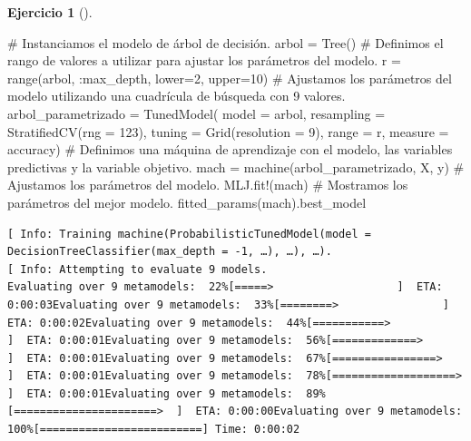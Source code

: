 \documentclass[
  a4paper,
]{scrreport}
\newenvironment{Shaded}{\begin{snugshade}}{\end{snugshade}}
\newcommand{\CommentTok}[1]{\textcolor[rgb]{0.37,0.37,0.37}{#1}}
\newcommand{\FloatTok}[1]{\textcolor[rgb]{0.68,0.00,0.00}{#1}}
\newcommand{\FunctionTok}[1]{\textcolor[rgb]{0.28,0.35,0.67}{#1}}
\newcommand{\NormalTok}[1]{\textcolor[rgb]{0.00,0.23,0.31}{#1}}
\newcommand{\OperatorTok}[1]{\textcolor[rgb]{0.37,0.37,0.37}{#1}}
\theoremstyle{definition}
\newtheorem{exercise}{Ejercicio}[chapter]
\theoremstyle{remark}
\begin{document}
\begin{exercise}[]
\begin{enumerate}
\begin{tcolorbox}
\begin{Shaded}
\begin{Highlighting}[]
\CommentTok{\# Instanciamos el modelo de árbol de decisión.}
\NormalTok{arbol }\OperatorTok{=} \FunctionTok{Tree}\NormalTok{()}
\CommentTok{\# Definimos el rango de valores a utilizar para ajustar los parámetros del modelo.}
\NormalTok{r }\OperatorTok{=} \FunctionTok{range}\NormalTok{(arbol, }\OperatorTok{:}\NormalTok{max\_depth, lower}\OperatorTok{=}\FloatTok{2}\NormalTok{, upper}\OperatorTok{=}\FloatTok{10}\NormalTok{)}
\CommentTok{\# Ajustamos los parámetros del modelo utilizando una cuadrícula de búsqueda con 9 valores.}
\NormalTok{arbol\_parametrizado }\OperatorTok{=} \FunctionTok{TunedModel}\NormalTok{(}
\NormalTok{    model }\OperatorTok{=}\NormalTok{ arbol,}
\NormalTok{    resampling }\OperatorTok{=} \FunctionTok{StratifiedCV}\NormalTok{(rng }\OperatorTok{=} \FloatTok{123}\NormalTok{),}
\NormalTok{    tuning }\OperatorTok{=} \FunctionTok{Grid}\NormalTok{(resolution }\OperatorTok{=} \FloatTok{9}\NormalTok{),}
\NormalTok{    range }\OperatorTok{=}\NormalTok{ r,}
\NormalTok{    measure }\OperatorTok{=}\NormalTok{ accuracy)}
\CommentTok{\# Definimos una máquina de aprendizaje con el modelo, las variables predictivas y la variable objetivo.}
\NormalTok{mach }\OperatorTok{=} \FunctionTok{machine}\NormalTok{(arbol\_parametrizado, X, y)}
\CommentTok{\# Ajustamos los parámetros del modelo.}
\NormalTok{MLJ.}\FunctionTok{fit!}\NormalTok{(mach)}
\CommentTok{\# Mostramos los parámetros del mejor modelo.}
\FunctionTok{fitted\_params}\NormalTok{(mach).best\_model}
\end{Highlighting}
\end{Shaded}

\begin{verbatim}
[ Info: Training machine(ProbabilisticTunedModel(model = DecisionTreeClassifier(max_depth = -1, …), …), …).
[ Info: Attempting to evaluate 9 models.
Evaluating over 9 metamodels:  22%[=====>                   ]  ETA: 0:00:03Evaluating over 9 metamodels:  33%[========>                ]  ETA: 0:00:02Evaluating over 9 metamodels:  44%[===========>             ]  ETA: 0:00:01Evaluating over 9 metamodels:  56%[=============>           ]  ETA: 0:00:01Evaluating over 9 metamodels:  67%[================>        ]  ETA: 0:00:01Evaluating over 9 metamodels:  78%[===================>     ]  ETA: 0:00:01Evaluating over 9 metamodels:  89%[======================>  ]  ETA: 0:00:00Evaluating over 9 metamodels: 100%[=========================] Time: 0:00:02
\end{verbatim}


\end{tcolorbox}
\end{enumerate}
\end{exercise}
\end{document}
